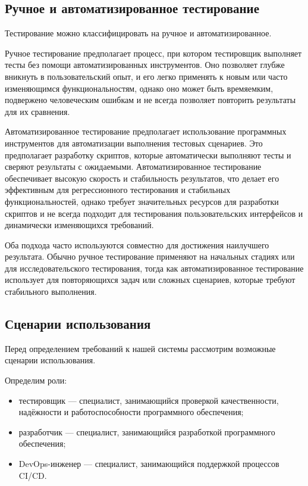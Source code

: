 \subsection{Ручное и автоматизированное тестирование}

Тестирование можно классифицировать на ручное и автоматизированное.

Ручное тестирование предполагает процесс, при котором тестировщик выполняет тесты без помощи автоматизированных инструментов.
Оно позволяет глубже вникнуть в пользовательский опыт, и его легко применять к новым или часто изменяющимся функциональностям, однако оно может быть времяемким, подвержено человеческим ошибкам и не всегда позволяет повторить результаты для их сравнения.

Автоматизированное тестирование предполагает использование программных инструментов для автоматизации выполнения тестовых сценариев. Это предполагает разработку скриптов, которые автоматически выполняют тесты и сверяют результаты с ожидаемыми.
Автоматизированное тестирование обеспечивает высокую скорость и стабильность результатов, что делает его эффективным для регрессионного тестирования и стабильных функциональностей, однако требует значительных ресурсов для разработки скриптов и не всегда подходит для тестирования пользовательских интерфейсов и динамически изменяющихся требований.

Оба подхода часто используются совместно для достижения наилучшего результата. Обычно ручное тестирование применяют на начальных стадиях или для исследовательского тестирования, тогда как автоматизированное тестирование использует для повторяющихся задач или сложных сценариев, которые требуют стабильного выполнения.

\subsection{Сценарии использования}

Перед определением требований к нашей системы рассмотрим возможные сценарии использования.

Определим роли:

\begin{itemize}
    \item тестировщик — специалист, занимающийся проверкой качественности, надёжности и работоспособности программного обеспечения;
    \item разработчик — специалист, занимающийся разработкой программного обеспечения;
    \item DevOps-инженер — специалист, занимающийся поддержкой процессов CI/CD.
\end{itemize}


